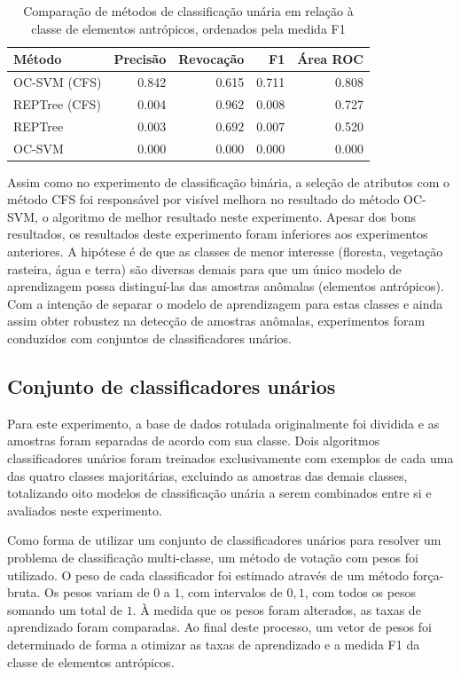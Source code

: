 \begin{table}[h]
\centering
\begin{tabulary}{\linewidth}{|L|R|R|R|R|}
\hline
\textbf{Método} & \textbf{Precisão} & \textbf{Revocação} & \textbf{F1} & \textbf{Área ROC} \\ \hline
OC-SVM (CFS)  & 0.842 & 0.615 & 0.711 & 0.808 \\ \hline
REPTree (CFS) & 0.004 & 0.962 & 0.008 & 0.727 \\ \hline
REPTree       & 0.003 & 0.692 & 0.007 & 0.520 \\ \hline
OC-SVM        & 0.000 & 0.000 & 0.000 & 0.000 \\ \hline
\end{tabulary}
\caption{Comparação de métodos de classificação unária em relação à classe de elementos antrópicos, ordenados pela medida F1}
\label{tab:experimentoUniclasseAntropico}
\end{table}

Assim como no experimento de classificação binária, a seleção de atributos com o método CFS foi responsável por visível melhora no resultado do método OC-SVM, o algoritmo de melhor resultado neste experimento. Apesar dos bons resultados, os resultados deste experimento foram inferiores aos experimentos anteriores. A hipótese é de que as classes de menor interesse (floresta, vegetação rasteira, água e terra) são diversas demais para que um único modelo de aprendizagem possa distinguí-las das amostras anômalas (elementos antrópicos). Com a intenção de separar o modelo de aprendizagem para estas classes e ainda assim obter robustez na detecção de amostras anômalas, experimentos foram conduzidos com conjuntos de classificadores unários.

\subsection{Conjunto de classificadores unários}

Para este experimento, a base de dados rotulada originalmente foi dividida e as amostras foram separadas de acordo com sua classe. Dois algoritmos classificadores unários foram treinados exclusivamente com exemplos de cada uma das quatro classes majoritárias, excluindo as amostras das demais classes, totalizando oito modelos de classificação unária a serem combinados entre si e avaliados neste experimento.

Como forma de utilizar um conjunto de classificadores unários para resolver um problema de classificação multi-classe, um método de votação com pesos foi utilizado. O peso de cada classificador foi estimado através de um método força-bruta. Os pesos variam de $0$ a $1$, com intervalos de $0,1$, com todos os pesos somando um total de $1$. À medida que os pesos foram alterados, as taxas de aprendizado foram comparadas. Ao final deste processo, um vetor de pesos foi determinado de forma a otimizar as taxas de aprendizado e a medida F1 da classe de elementos antrópicos.

